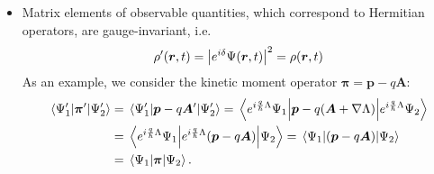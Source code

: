 \documentclass[11pt, a4paper]{article}
\renewcommand{\grad}{\nabla}
\newcommand{\Herm}{Hermitian\xspace}
\renewcommand{\vec}[1]{\bm{#1}}  %
\renewcommand{\r}{\vec{r}}  %
\newcommand{\A}{\vec{A}}  %
\renewcommand{\P}{\Psi}  %
\begin{document}
\begin{itemize}
	\item Matrix elements of observable quantities, which correspond to \Herm operators, are gauge-invariant, i.e.
	\begin{equation*}
		\rho'(\r, t) = \abs{e^{i\delta}\P(\r, t)}^{2} = \rho(\r, t)
	\end{equation*}
    As an example, we consider the kinetic moment operator $ \vec{\pi} = \vec{p} - q\A $:
	\begin{align*}
		\mel{\P_{1}'}{\vec{\pi}'}{\P_{2}'} & = \mel{\P_{1}'}{\vec{p} - q\A'}{\P_{2}'} = \mel{e^{i\frac{q}{\hbar}\Lambda}\P_{1}}{\vec{p} - q(\A + \grad \Lambda)}{e^{i\frac{q}{\hbar}\Lambda}\P_{2}}\\
		& =  \mel{e^{i\frac{q}{\hbar}\Lambda}\P_{1}}{e^{i\frac{q}{\hbar}\Lambda}(\vec{p} - q \A)}{\P_{2}} = \mel{\P_{1}}{(\vec{p} - q\A)}{\P_{2}}\\
		& = \mel{\P_{1}}{\vec{\pi}}{\P_{2}}.
	\end{align*}
\end{itemize}
\end{document}
